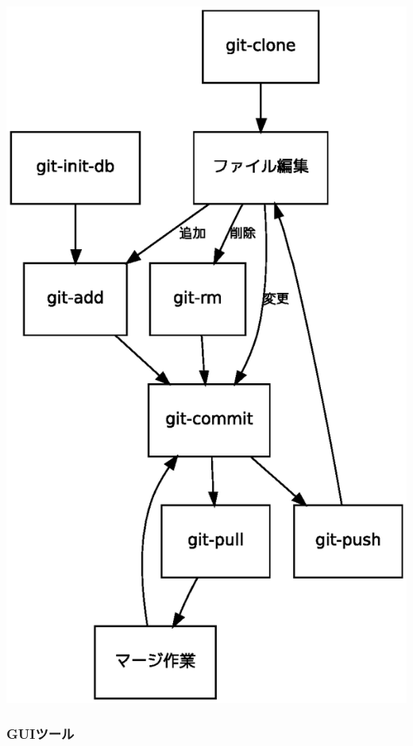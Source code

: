 \documentclass[mingoth,a4paper]{jsarticle}
\begin{document}
\begin{minipage}{0.5\hsize}
\includegraphics[width=1\hsize]{image200704/git-work.eps}
\end{minipage}

\subsubsection{GUIツール}
\end{document}
